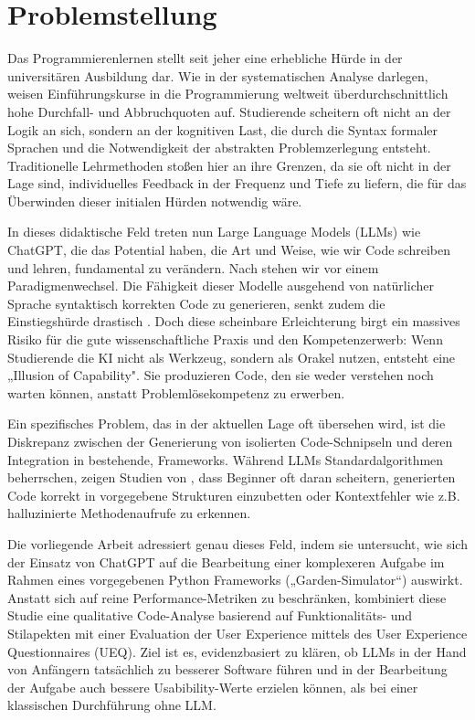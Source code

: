 

\section{Problemstellung}\label{cha:Problemstellung}

Das Programmierenlernen stellt seit jeher eine erhebliche Hürde in der universitären Ausbildung dar. Wie \textcite[S.~1]{SystematicLiteratureReview2019} in der systematischen Analyse darlegen, weisen Einführungskurse in die Programmierung weltweit  überdurchschnittlich hohe Durchfall- und Abbruchquoten auf. Studierende scheitern oft nicht an der Logik an sich, sondern an der kognitiven Last, die durch die Syntax formaler Sprachen und die Notwendigkeit der abstrakten Problemzerlegung entsteht. Traditionelle Lehrmethoden stoßen hier an ihre Grenzen, da sie oft nicht in der Lage sind, individuelles Feedback in der Frequenz und Tiefe zu liefern, die für das Überwinden dieser initialen Hürden notwendig wäre.

In dieses didaktische Feld treten nun Large Language Models (LLMs) wie ChatGPT, die das Potential haben, die Art und Weise, wie wir Code schreiben und lehren, fundamental zu verändern. Nach \textcite{DennyEra} stehen wir vor einem Paradigmenwechsel. Die Fähigkeit dieser Modelle ausgehend von natürlicher Sprache syntaktisch korrekten Code zu generieren, senkt zudem die Einstiegshürde drastisch \parencite[S.~500-501]{BeckerProgrammingHard}. Doch diese scheinbare Erleichterung birgt ein massives Risiko für die gute wissenschaftliche Praxis und den Kompetenzerwerb: Wenn Studierende die KI nicht als Werkzeug, sondern als Orakel nutzen, entsteht eine „Illusion of Capability"\parencite[S.~116]{PratherRobotsAreHere2023}. Sie produzieren Code, den sie weder verstehen noch warten können, anstatt Problemlösekompetenz zu erwerben.

Ein spezifisches Problem, das in der aktuellen Lage oft übersehen wird, ist die Diskrepanz zwischen der Generierung von isolierten Code-Schnipseln und deren Integration in bestehende, Frameworks. Während LLMs Standardalgorithmen beherrschen, zeigen Studien von \textcite[S.~7]{kazemitabaar_how_2023}, dass Beginner oft daran scheitern, generierten Code korrekt in vorgegebene Strukturen einzubetten oder Kontextfehler wie z.B. halluzinierte Methodenaufrufe zu erkennen.

Die vorliegende Arbeit adressiert genau dieses Feld, indem sie untersucht, wie sich der Einsatz von ChatGPT auf die Bearbeitung einer komplexeren Aufgabe im Rahmen eines vorgegebenen Python Frameworks („Garden-Simulator“) auswirkt. Anstatt sich auf reine Performance-Metriken zu beschränken, kombiniert diese Studie eine qualitative Code-Analyse basierend auf Funktionalitäts- und Stilapekten mit einer Evaluation der User Experience mittels des User Experience Questionnaires (UEQ). Ziel ist es, evidenzbasiert zu klären, ob LLMs in der Hand von Anfängern tatsächlich zu besserer Software führen und in der Bearbeitung der Aufgabe auch bessere Usabibility-Werte erzielen können, als bei einer klassischen Durchführung ohne LLM.
